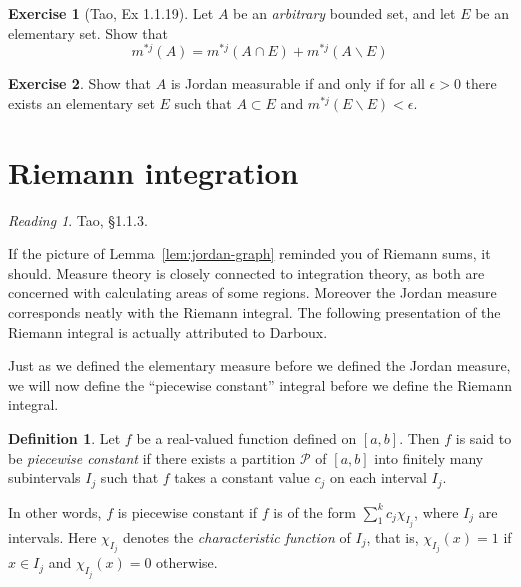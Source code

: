 \documentclass[11pt,oneside]{amsbook}
\renewcommand{\setminus}{\smallsetminus}
\theoremstyle{definition}
\newtheorem{exerc}{Exercise}[section]
\theoremstyle{plain}
\theoremstyle{definition}
\newtheorem{defn}[thm]{Definition}
\theoremstyle{remark}
\newtheorem*{reading}{Reading}
\numberwithin{equation}{section}
\numberwithin{figure}{section}
\begin{document}
\begin{exerc}[Tao, Ex 1.1.19]
  Let $A$ be an \emph{arbitrary} bounded set, and let $E$ be an elementary set. Show that
  \[m^{*j}(A)=m^{*j}(A\cap E)+m^{*j}(A\setminus E)
  \]
\end{exerc}

\begin{exerc}
  Show that $A$ is Jordan measurable if and only if for all $\epsilon>0$ there exists an elementary set $E$ such that $A\subset E$ and $m^{*j}(E\setminus E)<\epsilon$.
\end{exerc}

\newpage
\section{Riemann integration}


\begin{reading}
  Tao, \S1.1.3.
\end{reading}

If the picture of Lemma~\ref{lem:jordan-graph} reminded you of Riemann sums, it should. Measure theory is closely connected to integration theory, as both are concerned with calculating areas of some regions. Moreover the Jordan measure corresponds neatly with the Riemann integral. The following presentation of the Riemann integral is actually attributed to Darboux.

Just as we defined the elementary measure before we defined the Jordan measure, we will now define the ``piecewise constant'' integral before we define the Riemann integral.

\begin{defn}
  Let $f$ be a real-valued function defined on $[a,b]$. Then $f$ is said to be \emph{piecewise constant} if there exists a partition $\mathcal P$ of $[a,b]$ into finitely many subintervals $I_j$ such that $f$ takes a constant value $c_j$ on each interval $I_j$.
\end{defn}

In other words, $f$ is piecewise constant if $f$ is of the form $\sum_1^k c_j\chi_{I_j}$, where $I_j$ are intervals. Here $\chi_{I_j}$ denotes the \emph{characteristic function} of $I_j$, that is, $\chi_{I_j}(x)=1$ if $x\in I_j$ and $\chi_{I_j}(x)=0$ otherwise.
\end{document}
